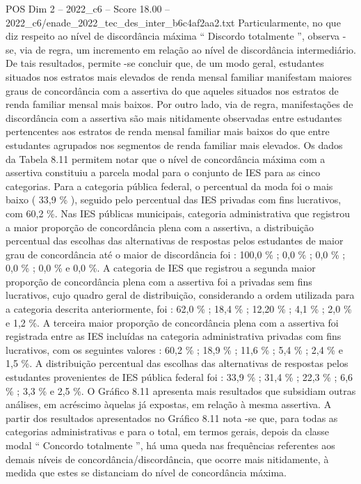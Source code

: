 \begin{textsample}{POS Dim 2 – 2022\_c6 – Score 18.00 – 2022\_c6/enade\_2022\_tec\_des\_inter\_b6c4af2aa2.txt}
Particularmente, no que diz respeito ao nível de discordância máxima “ Discordo totalmente ”, observa -se, via de regra, um incremento em relação ao nível de discordância intermediário.
De tais resultados, permite -se concluir que, de um modo geral, estudantes situados nos estratos mais elevados de renda mensal familiar manifestam maiores graus de concordância com a assertiva do que aqueles situados nos estratos de renda familiar mensal mais baixos.
Por outro lado, via de regra, manifestações de discordância com a assertiva são mais nitidamente observadas entre estudantes pertencentes aos estratos de renda mensal familiar mais baixos do que entre estudantes agrupados nos segmentos de renda familiar mais elevados.
Os dados da Tabela 8.11 permitem notar que o nível de concordância máxima com a assertiva constituiu a parcela modal para o conjunto de IES para as cinco categorias.
Para a categoria pública federal, o percentual da moda foi o mais baixo ( 33,9 \% ), seguido pelo percentual das IES privadas com fins lucrativos, com 60,2 \%.
Nas IES públicas municipais, categoria administrativa que registrou a maior proporção de concordância plena com a assertiva, a distribuição percentual das escolhas das alternativas de respostas pelos estudantes de maior grau de concordância até o maior de discordância foi : 100,0 \% ; 0,0 \% ; 0,0 \% ; 0,0 \% ; 0,0 \% e 0,0 \%.
A categoria de IES que registrou a segunda maior proporção de concordância plena com a assertiva foi a privadas sem fins lucrativos, cujo quadro geral de distribuição, considerando a ordem utilizada para a categoria descrita anteriormente, foi : 62,0 \% ; 18,4 \% ; 12,20 \% ; 4,1 \% ; 2,0 \% e 1,2 \%.
A terceira maior proporção de concordância plena com a assertiva foi registrada entre as IES incluídas na categoria administrativa privadas com fins lucrativos, com os seguintes valores : 60,2 \% ; 18,9 \% ; 11,6 \% ; 5,4 \% ; 2,4 \% e 1,5 \%.
A distribuição percentual das escolhas das alternativas de respostas pelos estudantes provenientes de IES pública federal foi : 33,9 \% ; 31,4 \% ; 22,3 \% ; 6,6 \% ; 3,3 \% e 2,5 \%.
O Gráfico 8.11 apresenta mais resultados que subsidiam outras análises, em acréscimo àquelas já expostas, em relação à mesma assertiva.
A partir dos resultados apresentados no Gráfico 8.11 nota -se que, para todas as categorias administrativas e para o total, em termos gerais, depois da classe modal “ Concordo totalmente ”, há uma queda nas frequências referentes aos demais níveis de concordância/discordância, que ocorre mais nitidamente, à medida que estes se distanciam do nível de concordância máxima.

\end{textsample}
